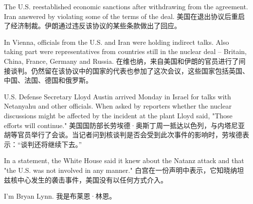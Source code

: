 The U.S. reestablished economic sanctions after withdrawing from the agreement. Iran answered by violating some of the terms of the deal.
美国在退出协议后重启了经济制裁。伊朗通过违反该协议的某些条款做出了回应。

In Vienna, officials from the U.S. and Iran were holding indirect talks. Also taking part were representatives from countries still in the nuclear deal -- Britain, China, France, Germany and Russia.
在维也纳，来自美国和伊朗的官员进行了间接谈判。仍然留在该协议中的国家的代表也参加了这次会议，这些国家包括英国、中国、法国、德国和俄罗斯。

U.S. Defense Secretary Lloyd Austin arrived Monday in Israel for talks with Netanyahu and other officials. When asked by reporters whether the nuclear discussions might be affected by the incident at the plant Lloyd said, "Those efforts will continue."
美国国防部长劳埃德·奥斯丁周一抵达以色列，与内塔尼亚胡等官员举行了会谈。当记者问到核谈判是否会受到此次事件的影响时，劳埃德表示：“谈判还将继续下去。”

In a statement, the White House said it knew about the Natanz attack and that "the U.S. was not involved in any manner."
白宫在一份声明中表示，它知晓纳坦兹核中心发生的袭击事件，美国没有以任何方式介入。

I'm Bryan Lynn.
我是布莱恩·林恩。
